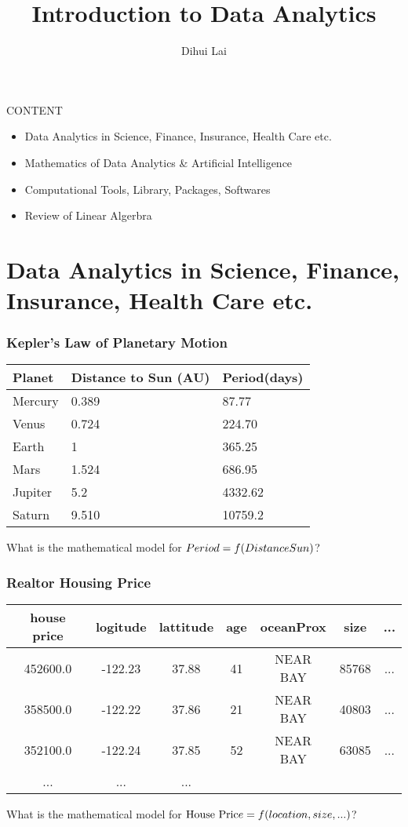 \documentclass[notheorems, aspectratio=54]{beamer}
\title{Introduction to Data Analytics}
\author{Dihui Lai}
\institute[WUSTL]{dlai@wustl.edu}
\begin{document}
\begin{frame}
    \titlepage
\end{frame}

\begin{frame}
CONTENT
\begin{itemize}
\item Data Analytics in Science, Finance, Insurance, Health Care etc. 
\item Mathematics of Data Analytics \& Artificial Intelligence 
\item Computational Tools, Library, Packages, Softwares
\item Review of Linear Algerbra 
\end{itemize}
\end{frame}

\section{Data Analytics in Science, Finance, Insurance, Health Care etc.}

\begin{frame}
\frametitle{Kepler's Law of Planetary Motion}
\begin{table}[]
\begin{tabular}{lll}
Planet &Distance to Sun (AU) &Period(days)\\
\hline
Mercury	&0.389	&87.77\\
Venus	&0.724	&224.70\\
Earth	&1	&365.25\\
Mars	&1.524	&686.95\\
Jupiter	&5.2	&4332.62\\
Saturn	&9.510	&10759.2\\
\hline
\end{tabular}
\end{table}
What is the mathematical model for $Period=\mathnormal{f}(DistanceSun)$?
\end{frame}

\begin{frame}
\frametitle{Realtor Housing Price}
\begin{table}[]
\begin{tabular} { c c c c c c c}
house price &logitude & lattitude & age  &oceanProx &size &...\\ 
\hline
452600.0 &-122.23	&37.88	&41 	&NEAR BAY &85768 &...\\
358500.0 &-122.22	&37.86	&21		&NEAR BAY &40803 & ...\\
352100.0 &-122.24	&37.85	&52 	&NEAR BAY &63085 & ...\\
... & ... & ... & & & &
\end{tabular}
\end{table}

What is the mathematical model for $\text{House Pric}e=\mathnormal{f}(location, size,  ...)$?

\end{frame}
\end{document}
